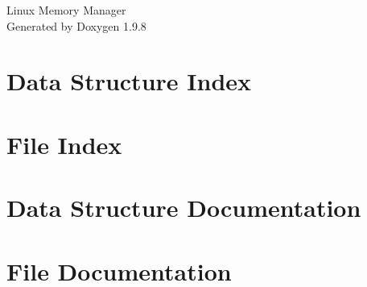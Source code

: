 \documentclass[twoside]{book}
\newcommand{\+}{\discretionary{\mbox{\scriptsize$\hookleftarrow$}}{}{}}
\newcommand{\clearemptydoublepage}{%
    \newpage{\pagestyle{empty}\cleardoublepage}%
  }
\begin{document}
  \raggedbottom
    \hypersetup{pageanchor=false,
                bookmarksnumbered=true,
                pdfencoding=unicode
               }
  \begin{titlepage}
  \vspace*{7cm}
  \begin{center}%
  {\Large Linux Memory Manager}\\
  \vspace*{1cm}
  {\large Generated by Doxygen 1.9.8}\\
  \end{center}
  \end{titlepage}
  \clearemptydoublepage
  \tableofcontents
  \clearemptydoublepage
  \hypersetup{pageanchor=true}








\chapter{Data Structure Index}

\chapter{File Index}

\chapter{Data Structure Documentation}








\chapter{File Documentation}

























  \backmatter
  \newpage
  \clearemptydoublepage
  \printindex
\end{document}
